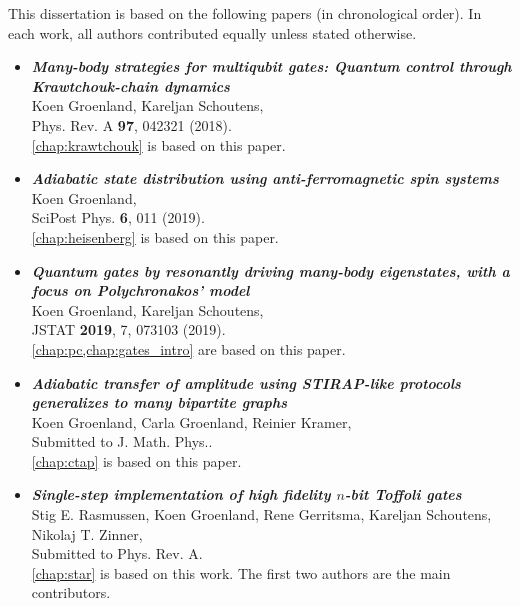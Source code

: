


This dissertation is based on the following papers (in chronological order). In each work, all authors contributed equally unless stated otherwise.

\begin{itemize}
\item[\cite{Groenland2018}] \textbf{\textit{Many-body strategies for multiqubit gates: Quantum control through Krawtchouk-chain dynamics}} \\
Koen Groenland, Kareljan Schoutens, \\
Phys. Rev. A \textbf{97}, 042321 (2018). \\
\cref{chap:krawtchouk} is based on this paper.
%
%
\item[\cite{Groenland2019}] \textbf{\textit{Adiabatic state distribution using anti-ferromagnetic spin systems}} \\
Koen Groenland, \\
SciPost Phys. \textbf{6}, 011 (2019). \\
\cref{chap:heisenberg} is based on this paper.
%
%
\item[\cite{Groenland2019a}] \textbf{\textit{Quantum gates by resonantly driving many-body eigenstates, with a focus on Polychronakos' model}} \\
Koen Groenland, Kareljan Schoutens, \\
JSTAT \textbf{2019}, 7, 073103 (2019). \\
\cref{chap:pc,chap:gates_intro} are based on this paper.
%
%
\item[\cite{Groenland2019b}] \textbf{\textit{Adiabatic transfer of amplitude using STIRAP-like protocols generalizes to many bipartite graphs}} \\
Koen Groenland, Carla Groenland, Reinier Kramer, \\
Submitted to J. Math. Phys.. \\
\cref{chap:ctap} is based on this paper.
%
%
\item[\cite{Rasmussen2019}] \textbf{\textit{Single-step implementation of high fidelity $n$-bit Toffoli gates}} \\
Stig E. Rasmussen, Koen Groenland, Rene Gerritsma, Kareljan Schoutens,\\ Nikolaj T. Zinner,\\
Submitted to Phys. Rev. A. \\
\cref{chap:star} is based on this work. The first two authors are the main contributors. 
\end{itemize}


